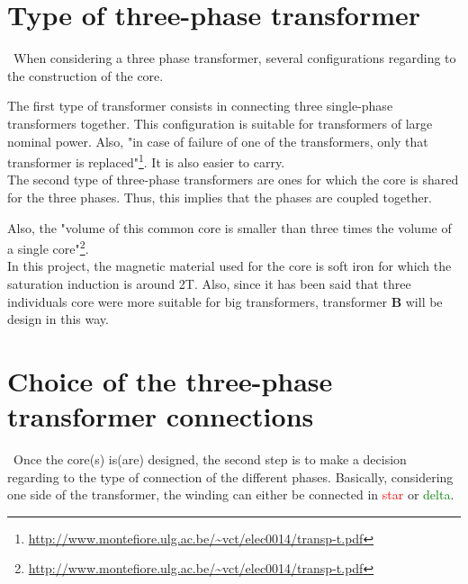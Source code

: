 \documentclass[12pt,a4paper]{report}
\begin{document}
\section{Type of three-phase transformer}
\quad\, When considering a three phase transformer, several configurations regarding to the construction of the core.

The first type of transformer consists in connecting three single-phase transformers together. This configuration is suitable for transformers of large nominal power. Also, "in case of failure of one of the transformers, only that transformer is replaced"\footnote{\url{http://www.montefiore.ulg.ac.be/~vct/elec0014/transp-t.pdf}}. It is also easier to carry.\\

The second type of three-phase transformers are ones for which the core is shared for the three phases. Thus, this implies that the phases are coupled together.

Also, the "volume of this common core is smaller than three times the volume of a single core"\footnote{\url{http://www.montefiore.ulg.ac.be/~vct/elec0014/transp-t.pdf}}.\\

In this project, the magnetic material used for the core is soft iron for which the saturation induction is around 2T. Also, since it has been said that three individuals core were more suitable for big transformers, transformer \textbf{B} will be design in this way.

\section{Choice of the three-phase transformer connections}
\quad\, Once the core(s) is(are) designed, the second step is to make a decision regarding to the type of connection of the different phases. Basically, considering one side of the transformer, the winding can either be connected in \textcolor{red}{star} or \textcolor{green}{delta}.
\end{document}
